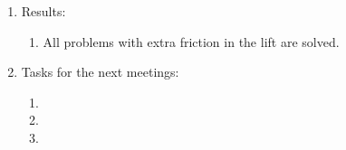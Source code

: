 \begin{enumerate}
\begin{enumerate}
	\end{enumerate}
	
	\item Results:
	\begin{enumerate}
		
		\item All problems with extra friction in the lift are solved.
		
	\end{enumerate}
	
	\item Tasks for the next meetings:
	\begin{enumerate}
		
		\item 
		
		\item 
		
        \item 
			
	\end{enumerate}
\end{enumerate}
\fillpage
